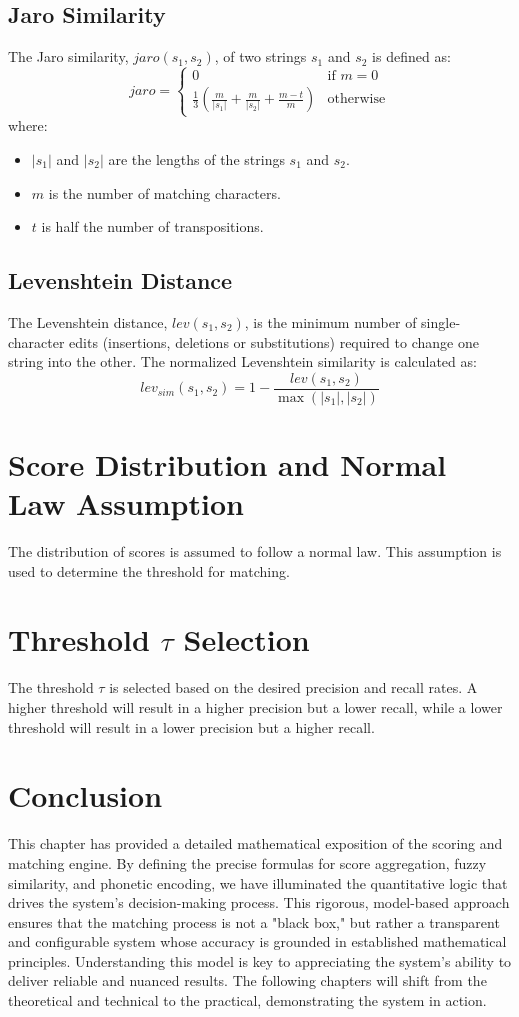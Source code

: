 \subsection{Jaro Similarity}
The Jaro similarity, $jaro(s_1, s_2)$, of two strings $s_1$ and $s_2$ is defined as:
\[
jaro =
\begin{cases}
    0 & \text{if } m = 0 \\
    \frac{1}{3} \left( \frac{m}{|s_1|} + \frac{m}{|s_2|} + \frac{m - t}{m} \right) & \text{otherwise}
\end{cases}
\]
where:
\begin{itemize}
    \item $|s_1|$ and $|s_2|$ are the lengths of the strings $s_1$ and $s_2$.
    \item $m$ is the number of matching characters.
    \item $t$ is half the number of transpositions.
\end{itemize}

\subsection{Levenshtein Distance}
The Levenshtein distance, $lev(s_1, s_2)$, is the minimum number of single-character edits (insertions, deletions or substitutions) required to change one string into the other. The normalized Levenshtein similarity is calculated as:
\[
lev_{sim}(s_1, s_2) = 1 - \frac{lev(s_1, s_2)}{\max(|s_1|, |s_2|)}
\]

\section{Score Distribution and Normal Law Assumption}
The distribution of scores is assumed to follow a normal law. This assumption is used to determine the threshold for matching.

\section{Threshold \(\tau\) Selection}
The threshold \(\tau\) is selected based on the desired precision and recall rates. A higher threshold will result in a higher precision but a lower recall, while a lower threshold will result in a lower precision but a higher recall.

\section{Conclusion}
This chapter has provided a detailed mathematical exposition of the scoring and matching engine. By defining the precise formulas for score aggregation, fuzzy similarity, and phonetic encoding, we have illuminated the quantitative logic that drives the system's decision-making process. This rigorous, model-based approach ensures that the matching process is not a "black box," but rather a transparent and configurable system whose accuracy is grounded in established mathematical principles. Understanding this model is key to appreciating the system's ability to deliver reliable and nuanced results. The following chapters will shift from the theoretical and technical to the practical, demonstrating the system in action.